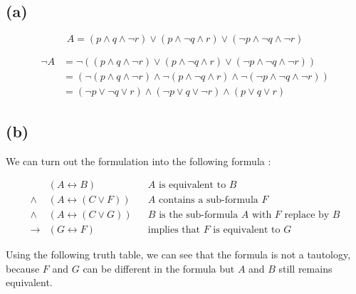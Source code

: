 \documentclass[a4paper,11pt]{report}
\begin{document}
\subsection*{(a)}

\[
  A = (p \wedge q \wedge \neg r) \vee (p \wedge \neg q \wedge r) \vee (\neg p
  \wedge \neg q \wedge \neg r)
\]

\begin{align*}
  \neg A &= \neg((p \wedge q \wedge \neg r) \vee (p \wedge \neg q \wedge r) \vee (\neg p
           \wedge \neg q \wedge \neg r))\\
         &= (\neg(p \wedge q \wedge \neg r) \wedge \neg(p \wedge \neg q \wedge r) \wedge \neg(\neg p \wedge \neg q \wedge \neg r))\\
         &= (\neg p \vee \neg q \vee r) \wedge (\neg p \vee q \vee \neg r) \wedge (p \vee q \vee r)
\end{align*}

\subsection*{(b)}

We can turn out the formulation into the following formula :

\begin{align*}
         &(A \leftrightarrow B) && \text{$A$ is equivalent to $B$}\\
  \wedge &(A \leftrightarrow (C \vee F)) && \text{$A$ contains a sub-formula $F$}\\
  \wedge &(A \leftrightarrow (C \vee G)) && \text{$B$ is the sub-formula $A$ with $F$ replace by $B$}\\
  \rightarrow &(G \leftrightarrow F) && \text{implies that $F$ is equivalent to $G$}
\end{align*}

Using the following truth table, we can see that the formula is not a tautology,
because $F$ and $G$ can be different in the formula but $A$ and $B$ still
remains equivalent.
\end{document}
